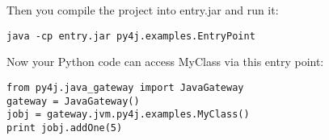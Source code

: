 Then you compile the project into entry.jar and run it:

\begin{verbatim}
java -cp entry.jar py4j.examples.EntryPoint
\end{verbatim}

Now your Python code can access MyClass via this entry point:

\begin{lstlisting}
from py4j.java_gateway import JavaGateway
gateway = JavaGateway()
jobj = gateway.jvm.py4j.examples.MyClass()
print jobj.addOne(5)
\end{lstlisting}







